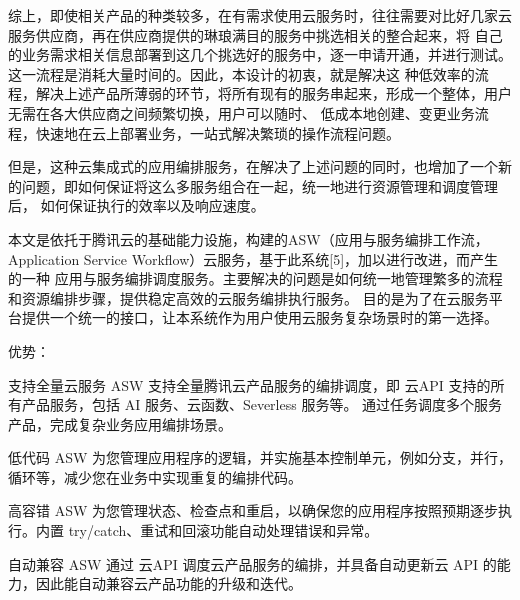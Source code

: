 %
%
%
%
%


综上，即使相关产品的种类较多，在有需求使用云服务时，往往需要对比好几家云服务供应商，再在供应商提供的琳琅满目的服务中挑选相关的整合起来，将
自己的业务需求相关信息部署到这几个挑选好的服务中，逐一申请开通，并进行测试。这一流程是消耗大量时间的。因此，本设计的初衷，就是解决这
种低效率的流程，解决上述产品所薄弱的环节，将所有现有的服务串起来，形成一个整体，用户无需在各大供应商之间频繁切换，用户可以随时、
低成本地创建、变更业务流程，快速地在云上部署业务，一站式解决繁琐的操作流程问题\cite{jydyyybp}。

但是，这种云集成式的应用编排服务，在解决了上述问题的同时，也增加了一个新的问题，即如何保证将这么多服务组合在一起，统一地进行资源管理和调度管理后，
如何保证执行的效率以及响应速度。

本文是依托于腾讯云的基础能力设施，构建的ASW（应用与服务编排工作流，Application Service Workflow）云服务，基于此系统[5]，加以进行改进，而产生的一种
应用与服务编排调度服务。主要解决的问题是如何统一地管理繁多的流程和资源编排步骤，提供稳定高效的云服务编排执行服务。
目的是为了在云服务平台提供一个统一的接口，让本系统作为用户使用云服务复杂场景时的第一选择。

优势：

支持全量云服务
ASW 支持全量腾讯云产品服务的编排调度，即 云API 支持的所有产品服务，包括 AI 服务、云函数、Severless 服务等。
通过任务调度多个服务产品，完成复杂业务应用编排场景。

低代码
ASW 为您管理应用程序的逻辑，并实施基本控制单元，例如分支，并行，循环等，减少您在业务中实现重复的编排代码。

高容错
ASW 为您管理状态、检查点和重启，以确保您的应用程序按照预期逐步执行。内置 try/catch、重试和回滚功能自动处理错误和异常。

自动兼容
ASW 通过 云API 调度云产品服务的编排，并具备自动更新云 API 的能力，因此能自动兼容云产品功能的升级和迭代。

